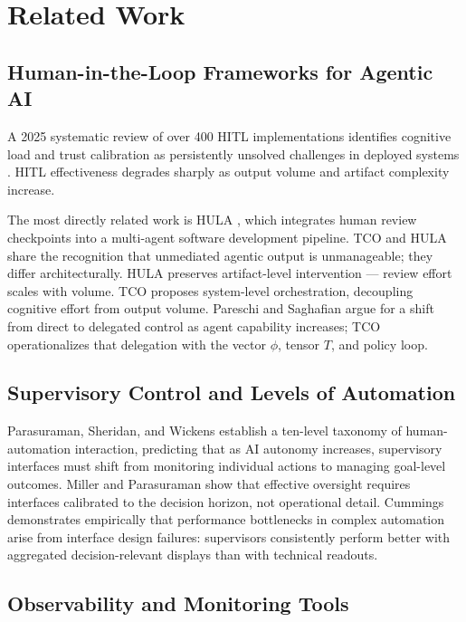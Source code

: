 \documentclass[manuscript,review,anonymous]{acmart}
\begin{document}
\section{Related Work}

\subsection{Human-in-the-Loop Frameworks for Agentic AI}

A 2025 systematic review of over 400 HITL implementations identifies cognitive load
and trust calibration as persistently unsolved challenges in deployed systems
\cite{hitlreview2025}. HITL effectiveness degrades sharply as output volume and
artifact complexity increase.

The most directly related work is HULA \cite{hula2024}, which integrates human review
checkpoints into a multi-agent software development pipeline. TCO and HULA share the
recognition that unmediated agentic output is unmanageable; they differ architecturally.
HULA preserves artifact-level intervention --- review effort scales with volume.
TCO proposes system-level orchestration, decoupling cognitive effort from output volume.
Pareschi and Saghafian \cite{pareschi2024} argue for a shift from direct to delegated
control as agent capability increases; TCO operationalizes that delegation with the
vector $\phi$, tensor $T$, and policy loop.

\subsection{Supervisory Control and Levels of Automation}

Parasuraman, Sheridan, and Wickens \cite{parasuraman2000levels} establish a ten-level
taxonomy of human-automation interaction, predicting that as AI autonomy increases,
supervisory interfaces must shift from monitoring individual actions to managing
goal-level outcomes. Miller and Parasuraman \cite{miller2007} show that effective
oversight requires interfaces calibrated to the decision horizon, not operational detail.
Cummings \cite{cummings2014} demonstrates empirically that performance bottlenecks in
complex automation arise from interface design failures: supervisors consistently
perform better with aggregated decision-relevant displays than with technical readouts.

\subsection{Observability and Monitoring Tools}
\end{document}

